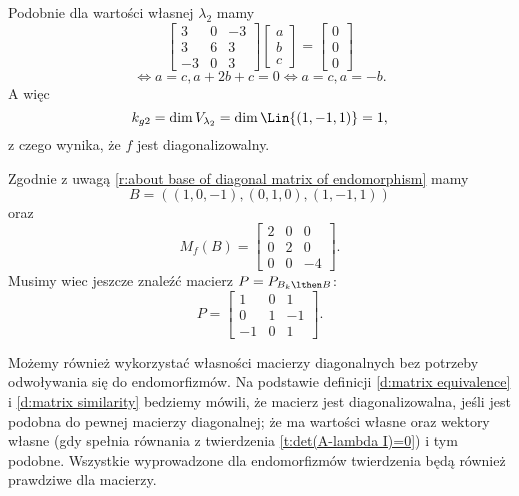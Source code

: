 \begin{solution}
    Podobnie dla wartości własnej $\lambda_2$ mamy
    \[ \begin{bmatrix}
        3 & 0 & -3 \\
        3 & 6 & 3 \\
        -3 & 0 & 3
    \end{bmatrix}\begin{bmatrix}
        a \\ b \\ c
    \end{bmatrix} = \begin{bmatrix}
        0 \\ 0 \\ 0
    \end{bmatrix} \]
    \[ \iff a = c, a + 2b + c = 0 \iff a = c, a = -b. \]
    A więc
    \[ k_{g2} = \dim V_{\lambda_2} = \dim\Lin\{(1, -1, 1)\} = 1, \]
    z czego wynika, że $f$ jest diagonalizowalny.

    Zgodnie z uwagą \ref{r:about base of diagonal matrix of endomorphism} mamy
    \[ B = ((1, 0, -1), (0, 1, 0), (1, -1, 1)) \]
    oraz
    \[ M_f(B) = \begin{bmatrix}
        2 & 0 & 0 \\
        0 & 2 & 0 \\
        0 & 0 & -4
    \end{bmatrix}. \]
    Musimy wiec jeszcze znaleźć macierz $P = P_{B_k\lthen B}$:
    \[ P = \begin{bmatrix}
        1 & 0 & 1 \\
        0 & 1 & -1 \\
        -1 & 0 & 1
    \end{bmatrix}. \]
\end{solution}

Możemy również wykorzystać własności macierzy diagonalnych bez potrzeby odwoływania się do endomorfizmów. Na podstawie definicji \ref{d:matrix equivalence} i \ref{d:matrix similarity} bedziemy mówili, że macierz jest diagonalizowalna, jeśli jest podobna do pewnej macierzy diagonalnej; że ma wartości własne oraz wektory własne (gdy spełnia równania z twierdzenia \ref{t:det(A-lambda I)=0}) i tym podobne. Wszystkie wyprowadzone dla endomorfizmów twierdzenia będą również prawdziwe dla macierzy.

